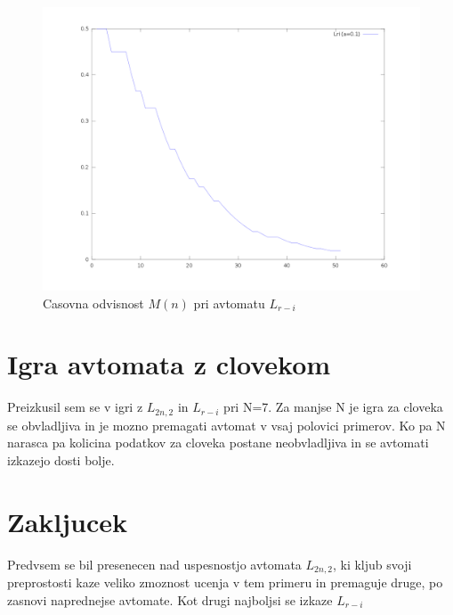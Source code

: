 \documentclass[10pt,a4paper]{report}
\begin{document}
\begin{figure}[h!]
\begin{center}
\includegraphics[scale=0.4]{lri_pen.png} 
\end{center}
\caption{Casovna odvisnost $M(n)$ pri avtomatu $L_{r-i}$}
\end{figure}

\section{Igra avtomata z clovekom}

Preizkusil sem se v igri z $L_{2n,2}$ in $L_{r-i}$ pri N=7. Za manjse N je igra za cloveka se obvladljiva in je mozno premagati avtomat v vsaj polovici primerov. Ko pa N narasca pa kolicina podatkov za cloveka postane neobvladljiva in se avtomati izkazejo dosti bolje.

\section{Zakljucek}

Predvsem se bil presenecen nad uspesnostjo avtomata $L_{2n,2}$, ki kljub svoji preprostosti kaze veliko zmoznost ucenja v tem primeru in premaguje druge, po zasnovi naprednejse avtomate. Kot drugi najboljsi se izkaze $L_{r-i}$
\end{document}
